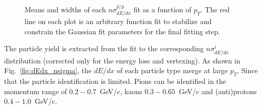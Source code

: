 \begin{figure}[h!]
\begin{subfigure}{.32\textwidth}
		\end{subfigure}
	\caption[Means and widths of each $n\sigma^{\bar{p}/p}_{dE/dx}$ fit as a function of $p_T$.]{Means and widths  of each $n\sigma^{\bar{p}/p}_{dE/dx}$ fit as a function of $p_T$.  The red line on each plot is an arbitrary function fit to stabilize and constrain the Gaussian fit parameters for the final fitting step.}
	\label{fig:dEdx_fit_parameters_P}
	
\end{figure}
The particle yield is extracted from the fit to the corresponding
$n\sigma^{i}_{dE/dx}$  distribution (corrected only for the energy loss and vertexing). As shown in Fig.~\ref{fig:dEdx_nsigma}, the $dE/dx$ of each particle type merge at large $p_T$. Since that  the particle identification is limited. Pions can be identified
in the momentum range of $0.2-0.7$~GeV/c, kaons
$0.3-0.65$~GeV/c and (anti)protons $0.4-1.0$~GeV/c. 
\FloatBarrier
